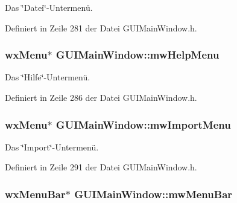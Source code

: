Das \char`\"{}\-Datei\char`\"{}-\/\-Untermenü. 



Definiert in Zeile 281 der Datei G\-U\-I\-Main\-Window.\-h.

\hypertarget{classGUIMainWindow_ae8fc1a9ba3768aa042a77b5bea117f6c}{
\subsubsection[{mw\-Help\-Menu}]{\setlength{\rightskip}{0pt plus 5cm}wx\-Menu$\ast$ G\-U\-I\-Main\-Window\-::mw\-Help\-Menu\hspace{0.3cm}{\ttfamily [private]}}}\label{classGUIMainWindow_ae8fc1a9ba3768aa042a77b5bea117f6c}


Das \char`\"{}\-Hilfe\char`\"{}-\/\-Untermenü. 



Definiert in Zeile 286 der Datei G\-U\-I\-Main\-Window.\-h.

\hypertarget{classGUIMainWindow_afaff9e1bec11b0f80215ceba76e87bc4}{
\subsubsection[{mw\-Import\-Menu}]{\setlength{\rightskip}{0pt plus 5cm}wx\-Menu$\ast$ G\-U\-I\-Main\-Window\-::mw\-Import\-Menu\hspace{0.3cm}{\ttfamily [private]}}}\label{classGUIMainWindow_afaff9e1bec11b0f80215ceba76e87bc4}


Das \char`\"{}\-Import\char`\"{}-\/\-Untermenü. 



Definiert in Zeile 291 der Datei G\-U\-I\-Main\-Window.\-h.

\hypertarget{classGUIMainWindow_a057a6728bf9aa994f41060ebe15a28ac}{
\subsubsection[{mw\-Menu\-Bar}]{\setlength{\rightskip}{0pt plus 5cm}wx\-Menu\-Bar$\ast$ G\-U\-I\-Main\-Window\-::mw\-Menu\-Bar\hspace{0.3cm}{\ttfamily [private]}}}\label{classGUIMainWindow_a057a6728bf9aa994f41060ebe15a28ac}


